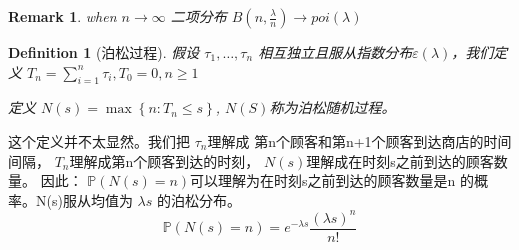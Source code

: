 \documentclass{article}
\newtheorem{definition}{Definition}
\newtheorem{remark}{Remark}
\begin{document}
\begin{remark}
    when $ n\rightarrow \infty $ 二项分布 $ B(n,\frac{\lambda}{n})\rightarrow poi(\lambda) $
\end{remark}



\begin{definition}[泊松过程]
   假设 $ \tau_1,\dots,\tau_n    $ 相互独立且服从指数分布$ \varepsilon (\lambda) $，我们定义 $ T_n=\sum_{i=1}^{n}\tau_i,T_0=0,n \geqslant 1 $
\par 定义   $ N(s)=\max   \left\{  n:T_n \leqslant s\right\} $, $ N(S) $称为泊松随机过程。


\end{definition}
这个定义并不太显然。我们把 $ \tau_n $理解成 第n个顾客和第n+1个顾客到达商店的时间间隔， $ T_n $理解成第n个顾客到达的时刻， $ N(s) $理解成在时刻s之前到达的顾客数量。
因此： $ \mathbb{P}(N(s)=n) $可以理解为在时刻s之前到达的顾客数量是n 的概率。N(s)服从均值为 $ \lambda s $ 的泊松分布。
\begin{equation}
    \mathbb{P}(N(s)=n)=e^{-\lambda s}\frac{(\lambda s)^n}{n!}
\end{equation}
\end{document}
